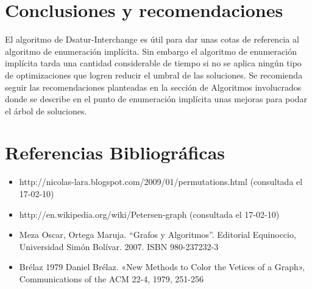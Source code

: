 \documentclass[a4paper,10pt]{article}
\begin{document}
\section{Conclusiones y recomendaciones}
El algoritmo de Dsatur-Interchange es útil para dar unas cotas de referencia al algoritmo de enumeración implícita. Sin 
embargo el algoritmo de enumeración implícita tarda una cantidad considerable de tiempo si no se aplica ningún tipo de optimizaciones que logren 
reducir el umbral de las soluciones. Se recomienda seguir las recomendaciones planteadas en la sección de Algoritmos involucrados donde se describe en el punto de enumeración implícita unas mejoras para podar el árbol de soluciones.

\section{Referencias Bibliográficas}
\begin{itemize}
 \item http://nicolas-lara.blogspot.com/2009/01/permutations.html (consultada el 17-02-10)
\item http://en.wikipedia.org/wiki/Petersen-graph (consultada el 17-02-10)
\item Meza Oscar, Ortega Maruja. “Grafos y Algoritmos”. Editorial Equinoccio, Universidad Simón Bolívar. 2007. ISBN 980-237232-3
\item Brélaz 1979 Daniel Brélaz. «New Methods to Color the Vetices of a Graph», Communications of the ACM 22-4, 1979, 251-256
\end{itemize}
\end{document}
